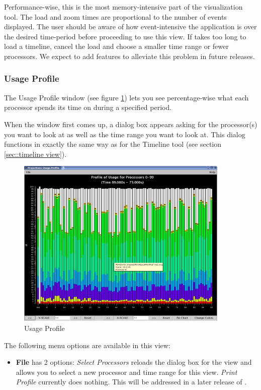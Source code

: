 \documentclass[10pt]{article}
\begin{document}
Performance-wise, this is the most memory-intensive part of the
visualization tool. The load and zoom times are proportional to the
number of events displayed. The user should be aware of how event-intensive the application is
over the desired time-period before proceeding to use this view. If
\projections{} takes too long to load a timeline, cancel the load and
choose a smaller time range or fewer processors. We expect to add features to alleviate
this problem in future releases.

\subsubsection{Usage Profile}
\label{sec::usage profile}
The Usage Profile window (see figure \ref{usage profile}) lets you see
percentage-wise what each processor spends its time on during a
specified period.

When the window first comes up, a dialog box appears asking for the
processor(s) you want to look at as well as the time range you want to
look at.  This dialog functions in exactly the same way as for the Timeline
tool (see section \ref{sec::timeline view}).

\begin{figure}[htb]
\center
\includegraphics[width=4.0in]{fig/usageprofile}
\caption{Usage Profile}
\label{usage profile}
\end{figure}

The following menu options are available in this view:

\begin{itemize}
\item {\bf File} has 2 options: {\it Select Processors} reloads the dialog
box for the view and allows you to select a new processor and time range
for this view. {\it Print Profile} currently does nothing. This will be
addressed in a later release of \projections{}.
\end{itemize}
\end{document}
